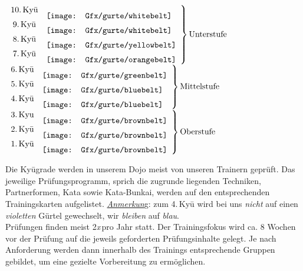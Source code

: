 	\setlength{\tabcolsep}{3pt}
	\null\vfill\null
	\begin{center}
	\parbox{\textwidth-2\tabcolsep}{
		\begin{center}
			$\left.\begin{array}{cl} \text{10.\,Ky\={u}} & \raisebox{-7.2pt}{\texttt{[image: Gfx/gurte/whitebelt]}}\\ \text{9.\,Ky\={u}} & \raisebox{-7.2pt}{\texttt{[image: Gfx/gurte/whitebelt]}}\\ \text{8.\,Ky\={u}} & \raisebox{-7.2pt}{\texttt{[image: Gfx/gurte/yellowbelt]}}\\ \text{7.\,Ky\={u}}& \raisebox{-7.2pt}{\texttt{[image: Gfx/gurte/orangebelt]}}\end{array} \right\}\text{Unterstufe}$\quad$\left.\begin{array}{cl} \text{6.\,Ky\={u}} & \raisebox{-7.2pt}{\texttt{[image: Gfx/gurte/greenbelt]}} \\ \text{5.\,Ky\={u}} & \raisebox{-7.2pt}{\texttt{[image: Gfx/gurte/bluebelt]}}\\ \text{4.\,Ky\={u}} & \raisebox{-7.2pt}{\texttt{[image: Gfx/gurte/bluebelt]}}\end{array} \right\}\text{Mittelstufe}$\quad$\left.\begin{array}{cl} \text{3.\,Kyu} & \raisebox{-7.2pt}{\texttt{[image: Gfx/gurte/brownbelt]}}\\ \text{2.\,Ky\={u}} & \raisebox{-7.2pt}{\texttt{[image: Gfx/gurte/brownbelt]}} \\ \text{1.\,Ky\={u}} & \raisebox{-7.2pt}{\texttt{[image: Gfx/gurte/brownbelt]}}\end{array} \right\}\text{Oberstufe}$
		\end{center}

		Die Ky\={u}grade werden in unserem Dojo meist von unseren Trainern geprüft. Das jeweilige Prüfungsprogramm, sprich die zugrunde liegenden Techniken, Partnerformen, Kata sowie Kata-Bunkai, werden auf den entsprechenden Trainingskarten aufgelistet. \textit{\underline{Anmerkun}}g: zum 4.\,Ky\={u} wird bei uns \textit{nicht} auf einen \textit{violetten} Gürtel gewechselt, wir \textit{bleiben} auf \textit{blau}.\\

		Prüfungen finden meist 2\textit{x}\,pro Jahr statt. Der Trainingsfokus wird ca. 8 Wochen vor der Prüfung auf die jeweils geforderten Prüfungsinhalte gelegt. Je nach Anforderung werden dann innerhalb des Trainings entsprechende Gruppen gebildet, um eine gezielte Vorbereitung zu ermöglichen.\\

}
\end{center}
